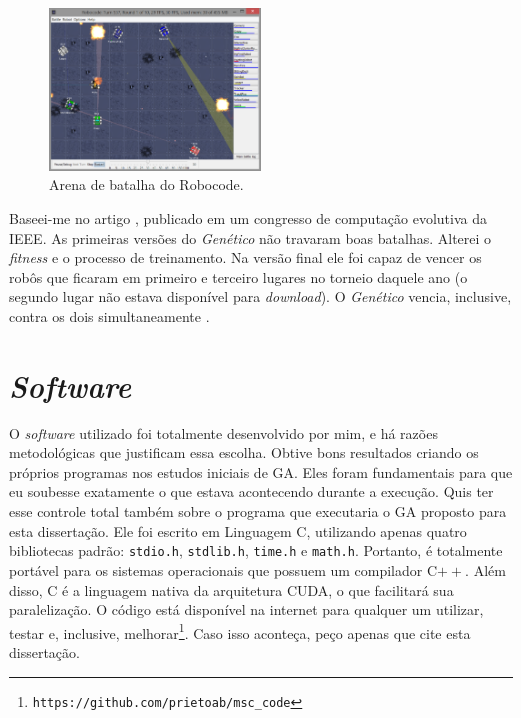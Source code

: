 	\begin{figure}[htbp]
		\centering
			\includegraphics[width=0.50\textwidth]{figs/materiais_metodo/ga/Robocode_Battle_Field.PNG}
		\caption{Arena de batalha do Robocode.}
		\label{fig:Robocode}
	\end{figure}
	
	Baseei-me no artigo \cite{robocodeGA}, publicado em um congresso de computação evolutiva da IEEE. As primeiras versões do \emph{Genético} não travaram boas batalhas. Alterei o \emph{fitness} e o processo de treinamento. Na versão final ele foi capaz de vencer os robôs que ficaram em primeiro e terceiro lugares no torneio daquele ano (o segundo lugar não estava disponível para \emph{download}). O \emph{Genético} vencia, inclusive, contra os dois simultaneamente \cite{robocodeGA_adriano}.
	

\section{\emph{Software}}

	O \emph{software} utilizado foi totalmente desenvolvido por mim, e há razões metodológicas que justificam essa escolha. Obtive bons resultados criando os próprios programas nos estudos iniciais de GA. Eles foram fundamentais para que eu soubesse exatamente o que estava acontecendo durante a execução. Quis ter esse controle total também sobre o programa que executaria o GA proposto para esta dissertação. Ele foi escrito em Linguagem C, utilizando apenas quatro bibliotecas padrão: \texttt{stdio.h}, \texttt{stdlib.h}, \texttt{time.h} e \texttt{math.h}. Portanto, é totalmente portável para os sistemas operacionais que possuem um compilador C$++$. Além disso, C é a linguagem nativa da arquitetura CUDA, o que facilitará sua paralelização. O código está disponível na internet para qualquer um utilizar, testar e, inclusive, melhorar\footnote{\texttt{https://github.com/prietoab/msc\_code}}. Caso isso aconteça, peço apenas que cite esta dissertação.
	

